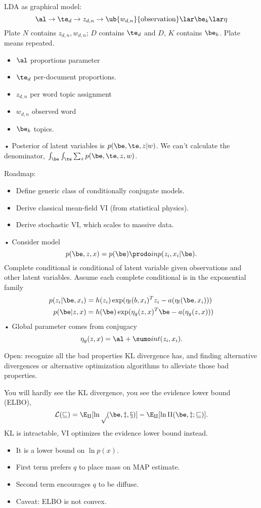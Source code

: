 
LDA as graphical model:
$$
\al \to \te_d \to z_{d,n} \to \ub{w_{d,n}}{\text{observation}} \lar \be_k \lar \eta
$$
Plate $N$ contains $z_{d,n},w_{d,n}$; $D$ contains $\te_d$ and $D$, $K$ contains $\be_k$. Plate means repeated. 
\begin{itemize}
\item
$\al$ proportions parameter
\item
$\te_d$ per-document proportions.
\item
$z_{d,n}$ per word topic assignment
\item
$w_{d,n}$ observed word
\item
$\be_k$ topics.
\end{itemize}•
Posterior of latent variables is $p(\be,\te,z|w)$. We can't calculate the denominator, $\int_\be\int_\te\sum_zp(\be, \te, z, w)$.

Roadmap:
\begin{itemize}
\item
Define generic class of conditionally conjugate models.
\item
Derive classical mean-field VI (from statistical physics).
\item
Derive stochastic VI, which scales to massive data.
\end{itemize}•
Consider model
$$p(\be, z, x) = p(\be) \prodo in p(z_i,x_i|\be).$$
Complete conditional is conditional of latent variable given observations and other latent variables. Assume each complete conditional is in the exponential family
\begin{align}
p(z_i|\be,x_i)&=h(z_i) \exp(\eta_l (b,x_i)^T z_i - a(\eta_l(\be,x_i)))\\
p(\be|z,x)&=h(\be) \exp(\eta_g (z,x)^T \be - a(\eta_g(z,x)))
\end{align}•
Global parameter comes from conjugacy
$$
\eta_g(z,x) = \al + \sumo in t(z_i,x_i).
$$

Open: recognize all the bad properties KL divergence has, and finding alternative divergences or alternative optimization algorithms to alleviate those bad properties.

You will hardly see the KL divergence, you see the evidence lower bound (ELBO),
$$
\cal L(v) = \E_q [\ln p(\be,z,x)] - \E_q[\ln q(\be, z;v)].
$$
KL is intractable, VI optimizes the evidence lower bound instead. 
\begin{itemize}
\item
It is a lower bound on $\ln p(x)$.
\item
First term prefers $q$ to place mass on MAP estimate.
\item
Second term encourages $q$ to be diffuse.
\item
Caveat: ELBO is not convex.
\end{itemize}

